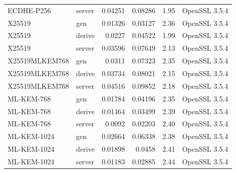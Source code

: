 \documentclass[preprint,12pt]{elsarticle}
\begin{document}
\begin{table}[!htbp]
{\begin{tabular}{@{}llrrrl@{}}
ECDHE-P256 & server & 0.04251 & 0.08286 & 1.95 & OpenSSL 3.5.4 \\
X25519 & gen & 0.01326 & 0.03127 & 2.36 & OpenSSL 3.5.4 \\
X25519 & derive & 0.0227 & 0.04522 & 1.99 & OpenSSL 3.5.4 \\
X25519 & server & 0.03596 & 0.07649 & 2.13 & OpenSSL 3.5.4 \\
X25519MLKEM768 & gen & 0.0311 & 0.07323 & 2.35 & OpenSSL 3.5.4 \\
X25519MLKEM768 & derive & 0.03734 & 0.08021 & 2.15 & OpenSSL 3.5.4 \\
X25519MLKEM768 & server & 0.04516 & 0.09852 & 2.18 & OpenSSL 3.5.4 \\
ML-KEM-768 & gen & 0.01784 & 0.04196 & 2.35 & OpenSSL 3.5.4 \\
ML-KEM-768 & derive & 0.01464 & 0.03499 & 2.39 & OpenSSL 3.5.4 \\
ML-KEM-768 & server & 0.0092 & 0.02203 & 2.40 & OpenSSL 3.5.4 \\
ML-KEM-1024 & gen & 0.02664 & 0.06338 & 2.38 & OpenSSL 3.5.4 \\
ML-KEM-1024 & derive & 0.01898 & 0.0458 & 2.41 & OpenSSL 3.5.4 \\
ML-KEM-1024 & server & 0.01183 & 0.02885 & 2.44 & OpenSSL 3.5.4 \\
\bottomrule
\end{tabular}}
\end{table}

\begin{table}[!htbp]\centering\small
\caption{Generated certificate sizes (bytes).}
\label{tab:certs}
\end{table}
\end{document}
